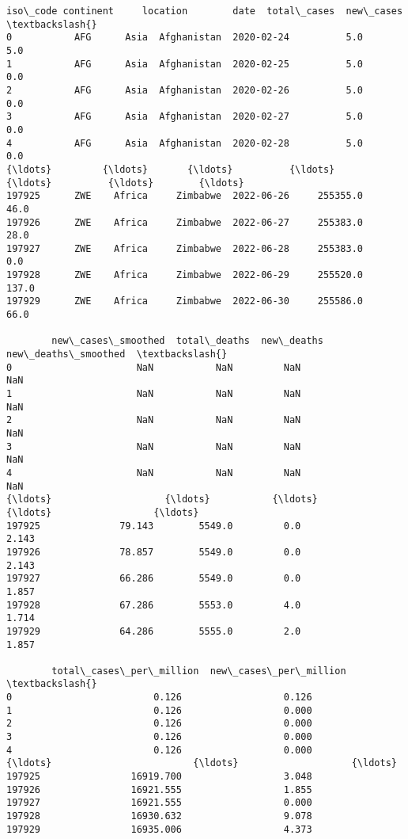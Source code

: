 \documentclass[11pt]{article}
\makeatletter
\newcommand{\boxspacing}{\kern\kvtcb@left@rule\kern\kvtcb@boxsep}
\newcommand{\prompt}[4]{
        {\ttfamily\llap{{\color{#2}[#3]:\hspace{3pt}#4}}\vspace{-\baselineskip}}
    }
\makeatother
\begin{document}
            \begin{tcolorbox}[breakable, size=fbox, boxrule=.5pt, pad at break*=1mm, opacityfill=0]
\prompt{Out}{outcolor}{22}{\boxspacing}
\begin{Verbatim}[commandchars=\\\{\}]
       iso\_code continent     location        date  total\_cases  new\_cases  \textbackslash{}
0           AFG      Asia  Afghanistan  2020-02-24          5.0        5.0
1           AFG      Asia  Afghanistan  2020-02-25          5.0        0.0
2           AFG      Asia  Afghanistan  2020-02-26          5.0        0.0
3           AFG      Asia  Afghanistan  2020-02-27          5.0        0.0
4           AFG      Asia  Afghanistan  2020-02-28          5.0        0.0
{\ldots}         {\ldots}       {\ldots}          {\ldots}         {\ldots}          {\ldots}        {\ldots}
197925      ZWE    Africa     Zimbabwe  2022-06-26     255355.0       46.0
197926      ZWE    Africa     Zimbabwe  2022-06-27     255383.0       28.0
197927      ZWE    Africa     Zimbabwe  2022-06-28     255383.0        0.0
197928      ZWE    Africa     Zimbabwe  2022-06-29     255520.0      137.0
197929      ZWE    Africa     Zimbabwe  2022-06-30     255586.0       66.0

        new\_cases\_smoothed  total\_deaths  new\_deaths  new\_deaths\_smoothed  \textbackslash{}
0                      NaN           NaN         NaN                  NaN
1                      NaN           NaN         NaN                  NaN
2                      NaN           NaN         NaN                  NaN
3                      NaN           NaN         NaN                  NaN
4                      NaN           NaN         NaN                  NaN
{\ldots}                    {\ldots}           {\ldots}         {\ldots}                  {\ldots}
197925              79.143        5549.0         0.0                2.143
197926              78.857        5549.0         0.0                2.143
197927              66.286        5549.0         0.0                1.857
197928              67.286        5553.0         4.0                1.714
197929              64.286        5555.0         2.0                1.857

        total\_cases\_per\_million  new\_cases\_per\_million  \textbackslash{}
0                         0.126                  0.126
1                         0.126                  0.000
2                         0.126                  0.000
3                         0.126                  0.000
4                         0.126                  0.000
{\ldots}                         {\ldots}                    {\ldots}
197925                16919.700                  3.048
197926                16921.555                  1.855
197927                16921.555                  0.000
197928                16930.632                  9.078
197929                16935.006                  4.373


\end{Verbatim}
\end{tcolorbox}
\end{document}
